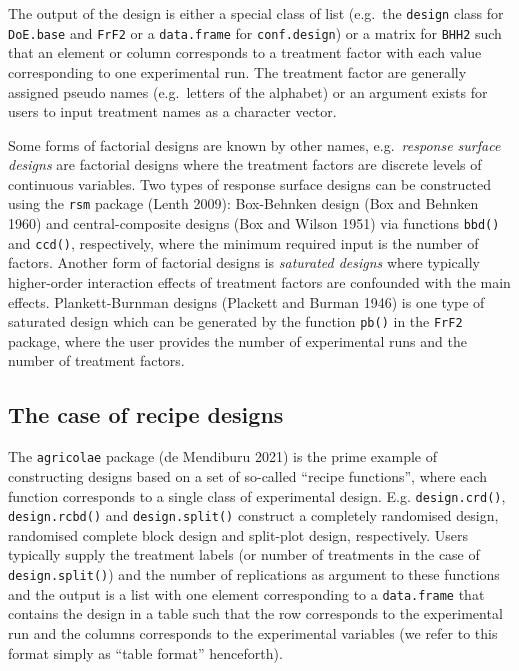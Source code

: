 \documentclass{article}
\begin{document}
The output of the design is either a special class of list (e.g.~the
\texttt{design} class for \texttt{DoE.base} and \texttt{FrF2} or a
\texttt{data.frame} for \texttt{conf.design}) or a matrix for
\texttt{BHH2} such that an element or column corresponds to a treatment
factor with each value corresponding to one experimental run. The
treatment factor are generally assigned pseudo names (e.g.~letters of
the alphabet) or an argument exists for users to input treatment names
as a character vector.

Some forms of factorial designs are known by other names,
e.g.~\emph{response surface designs} are factorial designs where the
treatment factors are discrete levels of continuous variables. Two types
of response surface designs can be constructed using the \texttt{rsm}
package (Lenth 2009): Box-Behnken design (Box and Behnken 1960) and
central-composite designs (Box and Wilson 1951) via functions
\texttt{bbd()} and \texttt{ccd()}, respectively, where the minimum
required input is the number of factors. Another form of factorial
designs is \emph{saturated designs} where typically higher-order
interaction effects of treatment factors are confounded with the main
effects. Plankett-Burnman designs (Plackett and Burman 1946) is one type
of saturated design which can be generated by the function \texttt{pb()}
in the \texttt{FrF2} package, where the user provides the number of
experimental runs and the number of treatment factors.

\hypertarget{the-case-of-recipe-designs}{%
\subsection{The case of recipe
designs}\label{the-case-of-recipe-designs}}

The \texttt{agricolae} package (de Mendiburu 2021) is the prime example
of constructing designs based on a set of so-called ``recipe
functions'', where each function corresponds to a single class of
experimental design. E.g. \texttt{design.crd()}, \texttt{design.rcbd()}
and \texttt{design.split()} construct a completely randomised design,
randomised complete block design and split-plot design, respectively.
Users typically supply the treatment labels (or number of treatments in
the case of \texttt{design.split()}) and the number of replications as
argument to these functions and the output is a list with one element
corresponding to a \texttt{data.frame} that contains the design in a
table such that the row corresponds to the experimental run and the
columns corresponds to the experimental variables (we refer to this
format simply as ``table format'' henceforth).
\end{document}
